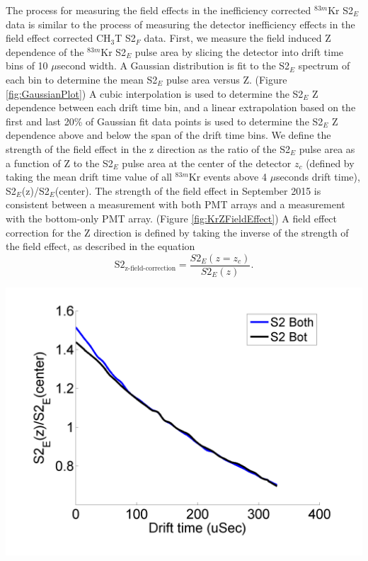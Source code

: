 \documentclass[a4paper,12pt]{article}
\begin{document}
{The process for measuring the field effects in the inefficiency corrected $^{83m}$Kr S2$_E$ data is similar to the process of measuring the detector inefficiency effects in the field effect corrected CH$_3$T S2$_F$ data.  First, we measure the field induced Z dependence of the $^{83m}$Kr S2$_E$ pulse area by slicing the detector into drift time bins of 10 $\mu$second width.  A Gaussian distribution is fit to the S2$_E$ spectrum of each bin to determine the mean S2$_E$ pulse area versus Z. (Figure \ref{fig:GaussianPlot})  A cubic interpolation is used to determine the S2$_E$ Z dependence between each drift time bin, and a linear extrapolation based on the first and last 20\% of Gaussian fit data points is used to determine the S2$_E$ Z dependence above and below the span of the drift time bins.  We define the strength of the field effect in the z direction as the ratio of the S2$_E$ pulse area as a function of Z to the S2$_E$ pulse area at the center of the detector $z_c$ (defined by taking the mean drift time value of all $^{83m}$Kr events above 4 $\mu$seconds drift time), S2$_E$(z)/S2$_E$(center). The strength of the field effect in September 2015 is consistent between a measurement with both PMT arrays and a measurement with the bottom-only PMT array. (Figure \ref{fig:KrZFieldEffect}) A field effect correction for the Z direction is defined by taking the inverse of the strength of the field effect, as described in the equation
\begin{equation}
\mbox{S}2_{\mbox{z-field-correction}} = \frac{S2_E(z=z_c)}{S2_E(z)}.
\end{equation} 


\begin{center}
\includegraphics[scale=0.5]{Run04Corrections/FieldEffectZ_S2Only.png}
 \label{fig:KrZFieldEffect}
\end{center}

}
\end{document}
